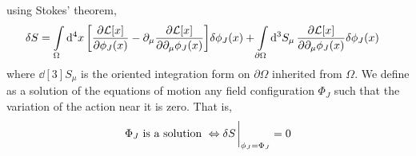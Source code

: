 using Stokes' theorem,
\begin{align}
    \delta S&=\int\limits_\Omega\dd[4]{x}\qty[\pdv{\mathcal L[x]}{\phi_J\qty(x)}-\partial_\mu\pdv{\mathcal L[x]}{\partial_\mu\phi_J\qty(x)}]\delta\phi_J(x)+\int\limits_{\partial\Omega}\dd[3]{S_\mu}\pdv{\mathcal L[x]}{\partial_\mu\phi_J\qty(x)}\delta\phi_J(x)\label{eq:deltaS}
\end{align}
where $\dd[3]{S_\mu}$ is the oriented integration form on $\partial\Omega$ inherited from $\Omega$. We define as a solution of the equations of motion any field configuration $\Phi_{J}$ such that the variation of 
the action near it is zero. That is,
\begin{align}
    \Phi_J\textnormal{ is a solution }\Leftrightarrow \delta S\eval_{\phi_J = \Phi_J} =0
\end{align}


